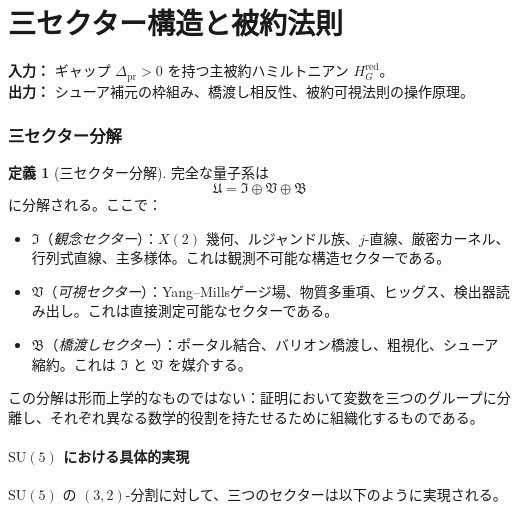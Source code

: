 \documentclass[12pt]{article}
\theoremstyle{plain}
\theoremstyle{definition}
\newtheorem{definition}[theorem]{定義}
\numberwithin{equation}{section}
\newcommand{\fU}{\mathfrak{U}}
\newcommand{\fI}{\mathfrak{I}}
\newcommand{\fV}{\mathfrak{V}}
\newcommand{\fB}{\mathfrak{B}}
\newcommand{\pr}{\mathrm{pr}}
\newcommand{\red}{\mathrm{red}}
\begin{document}

\part{三セクター構造と被約法則}

\noindent\textbf{入力：} ギャップ $\Delta_{\pr}>0$ を持つ主被約ハミルトニアン $H_G^{\red}$。\\
\textbf{出力：} シューア補元の枠組み、橋渡し相反性、被約可視法則の操作原理。

\section{三セクター分解}\label{sec:threesector}

\begin{definition}[三セクター分解]
完全な量子系は
\begin{equation}
\fU = \fI \oplus \fV \oplus \fB
\end{equation}
に分解される。ここで：
\begin{itemize}
\item $\fI$（\emph{観念セクター}）：$X(2)$ 幾何、ルジャンドル族、$j$-直線、厳密カーネル、行列式直線、主多様体。これは観測不可能な構造セクターである。
\item $\fV$（\emph{可視セクター}）：Yang--Millsゲージ場、物質多重項、ヒッグス、検出器読み出し。これは直接測定可能なセクターである。
\item $\fB$（\emph{橋渡しセクター}）：ポータル結合、バリオン橋渡し、粗視化、シューア縮約。これは $\fI$ と $\fV$ を媒介する。
\end{itemize}
\end{definition}

この分解は形而上学的なものではない：証明において変数を三つのグループに分離し、それぞれ異なる数学的役割を持たせるために組織化するものである。

\subsection{$\mathrm{SU}(5)$ における具体的実現}

$\mathrm{SU}(5)$ の $(3,2)$-分割に対して、三つのセクターは以下のように実現される。
\end{document}

